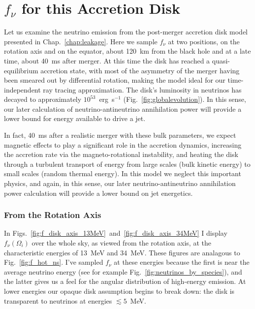 \section{$f_\nu$ for this Accretion Disk}
\label{sec:f_this_case}

Let us examine the neutrino emission from the post-merger accretion disk model
presented in Chap.~\ref{chap:leakage}. Here we sample $f_\nu$ at two positions,
on the rotation axis and on the equator, about 120~km from the black hole
and at a late time, about 40~ms after merger. At this time the disk has reached
a quasi-equilibrium accretion state, with most of the asymmetry of the merger
having been smeared out by differential rotation, making the model ideal for our
time-independent ray tracing approximation. The disk's luminosity in neutrinos
has decayed to approximately $10^{53}$~erg~s$^{-1}$
(Fig.~\ref{fig:globalevolution}). In this sense, our later calculation of
neutrino-antineutrino annihilation power will provide a lower bound for energy
available to drive a jet.

In fact, 40~ms after a realistic merger with these bulk parameters, we expect
magnetic effects to play a significant role in the accretion dynamics,
increasing the accretion rate via the magneto-rotational instability, and heating
the disk through a turbulent transport of energy from large scales (bulk kinetic
energy) to small scales (random thermal energy). In this model we neglect this
important physics, and again, in this sense, our later neutrino-antineutrino
annihilation power calculation will provide a lower bound on jet energetics.

\subsubsection{From the Rotation Axis}
\label{sssc:f_this_case_A}

In Figs.~\ref{fig:f_disk_axis_13MeV}~and~\ref{fig:f_disk_axis_34MeV} I display
$f_\nu(\Omega_i)$ over the whole sky, as viewed from the rotation axis, at the
characteristic energies of 13~MeV and 34~MeV. These figures are analagous to
Fig.~\ref{fig:f_hot_ns}. I've sampled $f_\nu$ at these energies because the first is
near the average neutrino energy (see for example
Fig.~\ref{fig:neutrinos_by_species}), and the latter gives us a feel for the
angular distribution of high-energy emission. At lower energies our opaque
disk assumption begins to break down: the disk is transparent to neutrinos at
energies $\lesssim5$~MeV.

